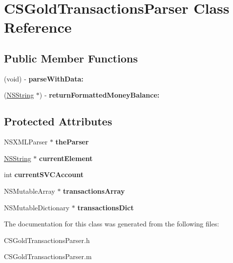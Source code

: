 \hypertarget{interface_c_s_gold_transactions_parser}{
\section{CSGoldTransactionsParser Class Reference}
\label{interface_c_s_gold_transactions_parser}
}
\subsection*{Public Member Functions}
\begin{DoxyCompactItemize}
\item 
\hypertarget{interface_c_s_gold_transactions_parser_af18571f407d20165bba41b759a8c9d61}{
(void) -\/ {\bfseries parseWithData:}}
\label{interface_c_s_gold_transactions_parser_af18571f407d20165bba41b759a8c9d61}

\item 
\hypertarget{interface_c_s_gold_transactions_parser_a3659e6c48fbdada1aa461fcb57759a4f}{
(\hyperlink{class_n_s_string}{NSString} $\ast$) -\/ {\bfseries returnFormattedMoneyBalance:}}
\label{interface_c_s_gold_transactions_parser_a3659e6c48fbdada1aa461fcb57759a4f}

\end{DoxyCompactItemize}
\subsection*{Protected Attributes}
\begin{DoxyCompactItemize}
\item 
\hypertarget{interface_c_s_gold_transactions_parser_a66077b8529e92ac808677e0cb73a9660}{
NSXMLParser $\ast$ {\bfseries theParser}}
\label{interface_c_s_gold_transactions_parser_a66077b8529e92ac808677e0cb73a9660}

\item 
\hypertarget{interface_c_s_gold_transactions_parser_aace2e53d86c3a4c13361fbf2a13c7fbc}{
\hyperlink{class_n_s_string}{NSString} $\ast$ {\bfseries currentElement}}
\label{interface_c_s_gold_transactions_parser_aace2e53d86c3a4c13361fbf2a13c7fbc}

\item 
\hypertarget{interface_c_s_gold_transactions_parser_acf89e0d8e974e6fc8da12afd7b32e77d}{
int {\bfseries currentSVCAccount}}
\label{interface_c_s_gold_transactions_parser_acf89e0d8e974e6fc8da12afd7b32e77d}

\item 
\hypertarget{interface_c_s_gold_transactions_parser_a30f4b02381c1357368b05509fa19b288}{
NSMutableArray $\ast$ {\bfseries transactionsArray}}
\label{interface_c_s_gold_transactions_parser_a30f4b02381c1357368b05509fa19b288}

\item 
\hypertarget{interface_c_s_gold_transactions_parser_a64c0e2e2e60c0600a77726dfdeea5419}{
NSMutableDictionary $\ast$ {\bfseries transactionsDict}}
\label{interface_c_s_gold_transactions_parser_a64c0e2e2e60c0600a77726dfdeea5419}

\end{DoxyCompactItemize}


The documentation for this class was generated from the following files:\begin{DoxyCompactItemize}
\item 
CSGoldTransactionsParser.h\item 
CSGoldTransactionsParser.m\end{DoxyCompactItemize}
